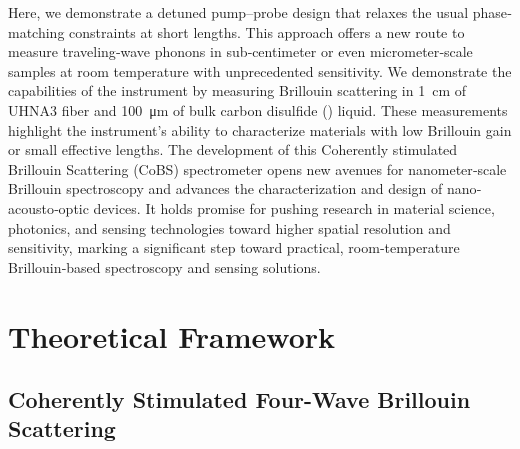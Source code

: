 Here, we demonstrate a detuned pump–probe design that relaxes the usual phase‐matching constraints at short lengths. This approach offers a new route to measure traveling‐wave phonons in sub‐centimeter or even micrometer‐scale samples at room temperature with unprecedented sensitivity. We demonstrate the capabilities of the instrument by measuring Brillouin scattering in \SI{1}{\centi\meter} of \ac{UHNA3} fiber and \SI{100}{\micro\meter} of bulk carbon disulfide () liquid. These measurements highlight the instrument’s ability to characterize materials with low Brillouin gain or small effective lengths. The development of this Coherently stimulated Brillouin Scattering (\acs{CoBS}) spectrometer opens new avenues for nanometer‐scale Brillouin spectroscopy and advances the characterization and design of nano‐acousto‐optic devices. It holds promise for pushing research in material science, photonics, and sensing technologies toward higher spatial resolution and sensitivity, marking a significant step toward practical, room‐temperature Brillouin‐based spectroscopy and sensing solutions.

\section{Theoretical Framework}
\label{Theoretical Framework}

\subsection{Coherently Stimulated Four-Wave Brillouin Scattering}
\label{Theoretical Framework:Coherently stimulated five-wave Brillouin scattering}

